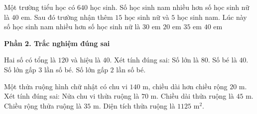 \begin{ex} %
Một trường tiểu học có $640$ học sinh. Số học sinh nam nhiều hơn số học sinh nữ là $40$ em. Sau đó trường nhận thêm $15$ học sinh nữ và $5$ học sinh nam. Lúc này số học sinh nam nhiều hơn số học sinh nữ là
\choice
{\True $30$ em}
{$20$ em}
{$35$ em}
{$40$ em}
\end{ex}

\textbf{Phần 2. Trắc nghiệm đúng sai}

\begin{ex} %
Hai số có tổng là $120$ và hiệu là $40$. Xét tính đúng sai:
\choiceTF
{\True Số lớn là $80$.}
{\True Số bé là $40$.}
{Số lớn gấp $3$ lần số bé.}
{\True Số lớn gấp $2$ lần số bé.}
\end{ex}

\begin{ex} %
Một thửa ruộng hình chữ nhật có chu vi $140\text{ m}$, chiều dài hơn chiều rộng $20\text{ m}$. Xét tính đúng sai:
\choiceTF
{\True Nửa chu vi thửa ruộng là $70\text{ m}$.}
{\True Chiều dài thửa ruộng là $45\text{ m}$.}
{Chiều rộng thửa ruộng là $35\text{ m}$.}
{\True Diện tích thửa ruộng là $1125\text{ m}^2$.}
\end{ex}

